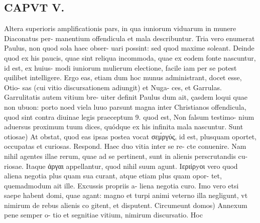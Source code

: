 \documentclass{article}
\begin{document}
\begin{pages}
\section*{CAPVT  V. }
\marginpar{[ p.285 ]}\pstart Altera superioris amplificationis pars, in qua iuniorum viduarum in munere Diaconatus per- manentium offendicula et mala describuntur. Tria vero enumerat Paulus, non quod sola haec obser- uari possint: sed quod maxime soleant. Deinde quod ex his paucis, quae sint reliqua incommoda, quae ex eodem fonte nascuntur, id est, ex huius- modi iuniorum mulierum electione, facile iam per se potest quilibet intelligere. Ergo eas, etiam dum hoc munus administrant, docet esse, Otio- sas (cui vitio discursationem adiungit) et Nuga- ces, et Garrulas. Garrulitatis autem vitium bre- uiter definit Paulus dum ait, çasdem loqui quae non ubuon: porto noed viela luuo parsunt magna inter Christianos offendicula, quod sint contra diuinae legis praeceptum 9. quod est, Non falsum testimo- nium aduersus proximum tuum dices, quódque ex his infinita mala nascuntur.  \pend\pstart Sunt otiosae) At obstat, quod eas ipsas postea vocat σεμ́ργύς, id est, plusquam oportet, occupatas et curiosas. Respond. Haec duo vitia inter se re- cte conuenire. Nam nihil agentes illae rerum, quae ad se pertinent, sunt in alienis perscrutandis cu- riosae. Itaque ἀργαι appellantur, quod nihil suum agunt. Iεριίρyοι vero quod aliena negotia plus quam sua curant, atque etiam plus quam opor- tet, quemadmodum ait ille. Excussis propriis a- liena negotia curo. Imo vero etsi saepe habent domi, quae agant: magno et turpi animi veterno illa negligunt, vt nimirum de rebus alienis co gitent, et disputent.  \pend\pstart Circumeunt domos) Annexum pene semper o- tio et segnitiae vitium, nimirum discursatio. Hoc  \pend

\end{pages}
\end{document}
